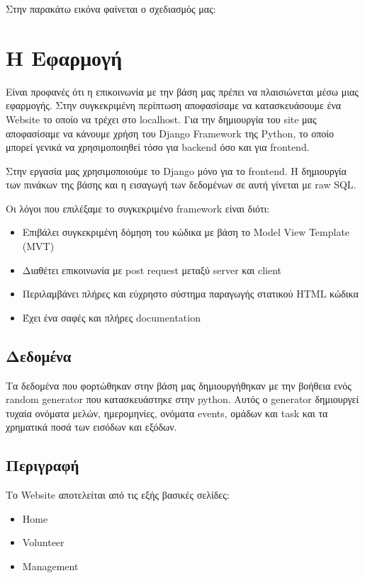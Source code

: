 \documentclass[manuscript,screen,review]{acmart}
\newcommand{\img}[1]
{
    \begin{center}
        \fcolorbox{black}{white}{\texttt{[image: \#1]}}
    \end{center}

}
\newcommand{\en}[1]{\foreignlanguage{english}{#1}}
\begin{document}
Στην παρακάτω εικόνα φαίνεται ο σχεδιασμός μας:

\img{./images/schema.png}


\section{Η Εφαρμογή}
Είναι προφανές ότι η επικοινωνία με την βάση μας πρέπει να πλαισιώνεται μέσω μιας εφαρμογής. Στην συγκεκριμένη περίπτωση αποφασίσαμε να κατασκευάσουμε ένα \en{Website} το οποίο να τρέχει στο \en{localhost}. Για την δημιουργία του \en{site} μας αποφασίσαμε να κάνουμε χρήση του \en{Django Framework} της \en{Python}, το οποίο μπορεί γενικά να χρησιμοποιηθεί τόσο για \en{backend} όσο και για \en{frontend}. 

Στην εργασία μας χρησιμοποιούμε το \en{Django} μόνο για το \en{frontend}. Η δημιουργία των πινάκων της βάσης και η εισαγωγή των δεδομένων σε αυτή γίνεται με \en{raw SQL}.

Oι λόγοι που επιλέξαμε το συγκεκριμένο \en{framework} είναι διότι:
\begin{itemize}
    \item Επιβάλει συγκεκριμένη δόμηση του κώδικα με βάση το \en{Model View Template (MVT)}
    \item Διαθέτει επικοινωνία με \en{post request} μεταξύ \en{server} και \en{client}
    \item Περιλαμβάνει πλήρες και εύχρηστο σύστημα παραγωγής στατικού \en{HTML} κώδικα
    \item Έχει ένα σαφές και πλήρες \en{documentation}
\end{itemize}

\subsection{Δεδομένα}
Τα δεδομένα που φορτώθηκαν στην βάση μας δημιουργήθηκαν με την βοήθεια ενός \en{random generator} που κατασκευάστηκε στην \en{python}. Αυτός ο \en{generator} δημιουργεί τυχαία ονόματα μελών, ημερομηνίες, ονόματα \en{events}, ομάδων και \en{task} και τα χρηματικά ποσά των εισόδων και εξόδων.

\subsection{Περιγραφή}

Το \en{Website} αποτελείται από τις εξής βασικές σελίδες:
\begin{itemize}
    \item \en{Home}
    \item \en{Volunteer}
    \item \en{Management}
\end{itemize}
\end{document}
